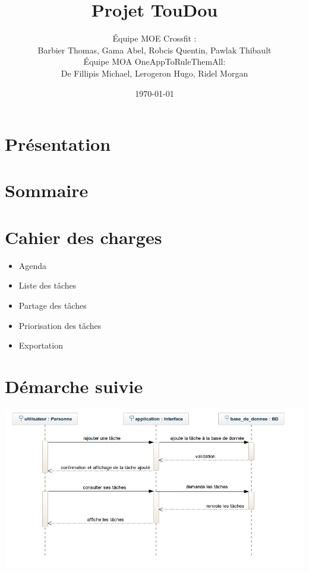 \documentclass[french]{beamer}
\title{Projet TouDou}
\author{Équipe MOE Crossfit : \\Barbier Thomas, Gama Abel, Robcis Quentin, Pawlak Thibault \\
\vspace{0.5cm}
Équipe MOA OneAppToRuleThemAll: \\De Fillipis Michael, Lerogeron Hugo, Ridel Morgan }
\institute[]{INSA de Rouen}
\date{\today}
\begin{document}
\section{Présentation}
\begin{frame}
\titlepage
\end{frame}

\section{Sommaire}
\begin{frame}
\tableofcontents
\end{frame}

\section{Cahier des charges}
\begin{frame}
\begin{itemize}
  \item Agenda
  \item Liste des tâches
  \item Partage des tâches
  \item Priorisation des tâches
  \item Exportation
\end{itemize}
\end{frame}

\section{Démarche suivie}
\begin{frame}
  \begin{center}
  \begin{minipage}[c]{0.6\linewidth}%
   \includegraphics[width=1\linewidth]{dss}  %
  \end{minipage}
\end{center}
\end{frame}
\end{document}
